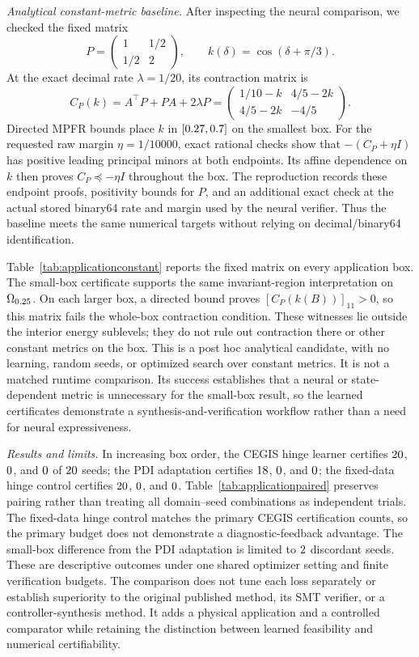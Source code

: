 \documentclass[12pt,onecolumn,journal]{IEEEtran}
\begin{document}
\noindent\textit{Analytical constant-metric baseline.}
After inspecting the neural comparison, we checked the fixed matrix
\[
P=\begin{pmatrix}1&1/2\\1/2&2\end{pmatrix},
\qquad k(\delta)=\cos(\delta+\pi/3).
\]
At the exact decimal rate $\lambda=1/20$, its contraction matrix is
\[
C_P(k)=A^\top P+PA+2\lambda P
=\begin{pmatrix}1/10-k&4/5-2k\\4/5-2k&-4/5\end{pmatrix}.
\]
Directed MPFR bounds place $k$ in $[0.27,0.7]$ on the smallest box. For the requested raw margin $\eta=1/10000$, exact rational checks show that $-(C_P+\eta I)$ has positive leading principal minors at both endpoints. Its affine dependence on $k$ then proves $C_P\preceq-\eta I$ throughout the box. The reproduction records these endpoint proofs, positivity bounds for $P$, and an additional exact check at the actual stored binary64 rate and margin used by the neural verifier. Thus the baseline meets the same numerical targets without relying on decimal/binary64 identification.

Table~\ref{tab:applicationconstant} reports the fixed matrix on every application box. The small-box certificate supports the same invariant-region interpretation on $\Omega_{0.25}$. On each larger box, a directed bound proves $[C_P(k(B))]_{11}>0$, so this matrix fails the whole-box contraction condition. These witnesses lie outside the interior energy sublevels; they do not rule out contraction there or other constant metrics on the box. This is a post hoc analytical candidate, with no learning, random seeds, or optimized search over constant metrics. It is not a matched runtime comparison. Its success establishes that a neural or state-dependent metric is unnecessary for the small-box result, so the learned certificates demonstrate a synthesis-and-verification workflow rather than a need for neural expressiveness.

\noindent\textit{Results and limits.}
In increasing box order, the CEGIS hinge learner certifies $20$, $0$, and $0$ of $20$ seeds; the PDI adaptation certifies $18$, $0$, and $0$; the fixed-data hinge control certifies $20$, $0$, and $0$. Table~\ref{tab:applicationpaired} preserves pairing rather than treating all domain--seed combinations as independent trials. The fixed-data hinge control matches the primary CEGIS certification counts, so the primary budget does not demonstrate a diagnostic-feedback advantage. The small-box difference from the PDI adaptation is limited to $2$ discordant seeds. These are descriptive outcomes under one shared optimizer setting and finite verification budgets. The comparison does not tune each loss separately or establish superiority to the original published method, its SMT verifier, or a controller-synthesis method. It adds a physical application and a controlled comparator while retaining the distinction between learned feasibility and numerical certifiability.
\end{document}

